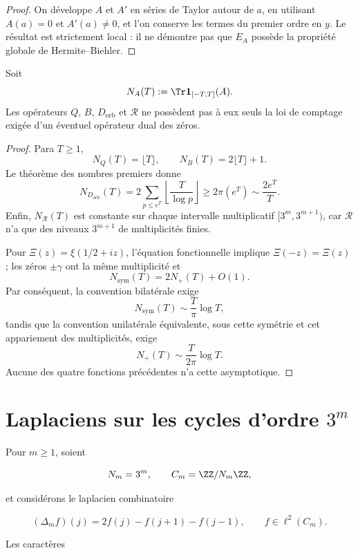 \begin{proof}
On développe \(A\) et \(A'\) en séries de Taylor autour de \(a\), en utilisant
\(A(a)=0\) et \(A'(a)\ne0\), et l'on conserve les termes du premier ordre en
\(y\). Le résultat est strictement local : il ne démontre pas que \(E_A\) possède la
propriété globale de Hermite--Biehler.
\end{proof}

\begin{proposition}
\label{pf84:E14}
Soit
\[
 N_A(T):=\Tr\mathbf1_{[-T,T]}(A).
\]
Les opérateurs \(Q\), \(B\), \(D_{\mathrm{orb}}\) et \(\mathcal R\) ne
possèdent pas à eux seuls la loi de comptage exigée d'un éventuel opérateur dual
des zéros.
\end{proposition}

\begin{proof}
Para \(T\ge1\),
\[
 N_Q(T)=\lfloor T\rfloor,
 \qquad
 N_B(T)=2\lfloor T\rfloor+1.
\]
Le théorème des nombres premiers donne
\[
 N_{D_{\mathrm{orb}}}(T)
 =2\sum_{p\le e^T}\left\lfloor\frac{T}{\log p}\right\rfloor
 \ge2\pi(e^T)\sim\frac{2e^T}{T}.
\]
Enfin, \(N_{\mathcal R}(T)\) est constante sur chaque intervalle
multiplicatif \([3^m,3^{m+1})\), car \(\mathcal R\) n'a que des niveaux
\(3^{m+1}\) de multiplicités finies.

Pour
\(\Xi(z)=\xi(1/2+iz)\), l'équation fonctionnelle implique
\(\Xi(-z)=\Xi(z)\) ; les zéros \(\pm\gamma\) ont la même multiplicité et
\[
 N_{\mathrm{sym}}(T)=2N_+(T)+O(1).
\]
Par conséquent, la convention bilatérale exige
\[
 N_{\mathrm{sym}}(T)\sim\frac{T}{\pi}\log T,
\]
tandis que la convention unilatérale équivalente, sous cette symétrie et cet appariement des
multiplicités, exige
\[
 N_+(T)\sim\frac{T}{2\pi}\log T.
\]
Aucune des quatre fonctions précédentes n'a cette asymptotique.
\end{proof}

\section{Laplaciens sur les cycles d'ordre \texorpdfstring{$3^m$}{puissances de trois}}

Pour $m\geq 1$, soient

\[
 N_m=3^m,
 \qquad
 C_m=\ZZ/N_m\ZZ,
\]

et considérons le laplacien combinatoire

\[
 (\Delta_m f)(j)=2f(j)-f(j+1)-f(j-1),
 \qquad f\in\ell^2(C_m).
\]

Les caractères

